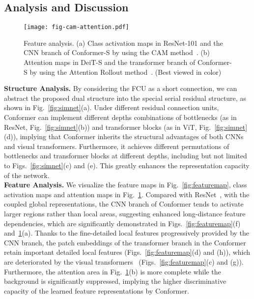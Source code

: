 \documentclass[10pt,twocolumn,letterpaper]{article}
\begin{document}
\subsection{Analysis and Discussion}\label{ssec:analysis}

\begin{figure}[t]
\begin{center}
\texttt{[image: fig-cam-attention.pdf]}
\end{center}
\vspace{-1em}
\caption{Feature analysis. (a) Class activation maps in ResNet-101 and the CNN branch of Conformer-S by using the CAM method~\cite{CAM2015}. (b) Attention maps in DeiT-S and the transformer branch of Conformer-S by using the Attention Rollout method~\cite{AttentionMap2020}. (Best viewed in color)}
\label{fig:attention}
\end{figure}


\noindent\textbf{Structure Analysis.} 
By considering the FCU as a short connection, we can abstract the proposed dual structure into the special serial residual structure, as shown in Fig.~\ref{fig:simnet}(a). Under different residual connection units, Conformer can implement different depths combinations of bottlenecks (as in ResNet, Fig.~\ref{fig:simnet}(b)) and transformer blocks (as in ViT, Fig.~\ref{fig:simnet}(d)), implying that Conformer inherits the structural advantages of both CNNs and visual transformers. Furthermore, it achieves different permutations of bottlenecks and transformer blocks at different depths, including but not limited to Figs.~\ref{fig:simnet}(c) and (e). This greatly enhances the representation capacity of the network. 
~\\


\noindent\textbf{Feature Analysis.} 
We visualize the feature maps in Fig.~\ref{fig:featuremap}, class activation maps and attention maps in Fig.~\ref{fig:attention}.
Compared with ResNet~\cite{ResNet2016}, with the coupled global representations, the CNN branch of Conformer tends to activate larger regions rather than local areas, suggesting enhanced long-distance feature dependencies, which are significantly demonstrated in Figs.~\ref{fig:featuremap}(f) and~\ref{fig:attention}(a). Thanks to the fine-detailed local features progressively provided by the CNN branch, the patch embeddings of the transformer branch in the Conformer retain important detailed local features (Figs.~\ref{fig:featuremap}(d) and (h)), which are deteriorated by the visual transformers~\cite{ViT2020,DeiT2020} (Figs.~\ref{fig:featuremap}(c) and (g)). Furthermore, the attention area in Fig.~\ref{fig:attention}(b) is more complete while the background is significantly suppressed, implying the higher discriminative capacity of the learned feature representations by Conformer.
\end{document}
